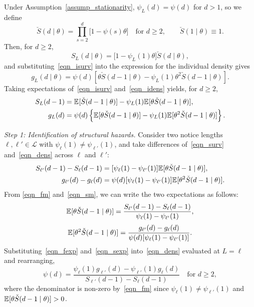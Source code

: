 \documentclass{div}
\begin{document}
Under Assumption~\ref{assump_stationarity}, $\psi_L(d) = \psi(d)$ for $d > 1$, so we define
\[
\check{S}(d \mid \theta) = \prod_{s=2}^{d} \big[1 - \psi(s)\theta\big] \quad \text{for } d \geq 2, \qquad \check{S}(1 \mid \theta) \equiv 1.
\]
Then, for $d \geq 2$,
\begin{equation}\label{eqn_isurv}
S_L(d \mid \theta) = \big[1 - \psi_L(1)\theta\big]\check{S}(d \mid \theta),
\end{equation}
and substituting~\eqref{eqn_isurv} into the expression for the individual density gives
\begin{equation}\label{eqn_idens}
g_L(d \mid \theta) = \psi(d)\left[\theta\check{S}(d-1 \mid \theta) - \psi_L(1)\theta^2\check{S}(d-1 \mid \theta)\right].
\end{equation}
Taking expectations of~\eqref{eqn_isurv} and~\eqref{eqn_idens} yields, for $d \geq 2$,
\begin{align}
\label{eqn_surv} S_L(d-1) &= \E[\check{S}(d-1 \mid \theta)] - \psi_L(1)\E[\theta\check{S}(d-1 \mid \theta)], \\
\label{eqn_dens} g_L(d) &= \psi(d)\left\{\E[\theta\check{S}(d-1 \mid \theta)] - \psi_L(1)\E[\theta^2\check{S}(d-1 \mid \theta)]\right\}.
\end{align}

\noindent \textit{Step 1: Identification of structural hazards.} Consider two notice lengths $\ell, \ell' \in \mathcal{L}$ with $\psi_\ell(1) \neq \psi_{\ell'}(1)$, and take differences of~\eqref{eqn_surv} and~\eqref{eqn_dens} across $\ell$ and $\ell'$:
\begin{align}
\label{eqn_fm} S_{\ell'}(d-1) - S_\ell(d-1) &= [\psi_\ell(1) - \psi_{\ell'}(1)]\E[\theta\check{S}(d-1 \mid \theta)], \\
\label{eqn_sm} g_{\ell'}(d) - g_\ell(d) &= \psi(d)[\psi_\ell(1) - \psi_{\ell'}(1)]\E[\theta^2\check{S}(d-1 \mid \theta)].
\end{align}
From \eqref{eqn_fm} and~\eqref{eqn_sm}, we can write the two expectations as follows: 
\begin{equation}\label{eqn_fexp}
\E[\theta\check{S}(d-1 \mid \theta)] = \frac{S_{\ell'}(d-1) - S_\ell(d-1)}{\psi_\ell(1) - \psi_{\ell'}(1)},
\end{equation}
\begin{equation}\label{eqn_sexp}
\E[\theta^2\check{S}(d-1 \mid \theta)] = \frac{g_{\ell'}(d) - g_\ell(d)}{\psi(d)[\psi_\ell(1) - \psi_{\ell'}(1)]}.
\end{equation}
Substituting~\eqref{eqn_fexp} and~\eqref{eqn_sexp} into~\eqref{eqn_dens} evaluated at $L = \ell$ and rearranging,
\begin{equation}\label{eqn_psi_d}
\psi(d) = \frac{\psi_\ell(1)g_{\ell'}(d) - \psi_{\ell'}(1)g_\ell(d)}{S_{\ell'}(d-1) - S_\ell(d-1)} \quad \text{for } d \geq 2,
\end{equation}
where the denominator is non-zero by~\eqref{eqn_fm} since $\psi_\ell(1) \neq \psi_{\ell'}(1)$ and $\E[\theta\check{S}(d-1 \mid \theta)] > 0$.
\end{document}
